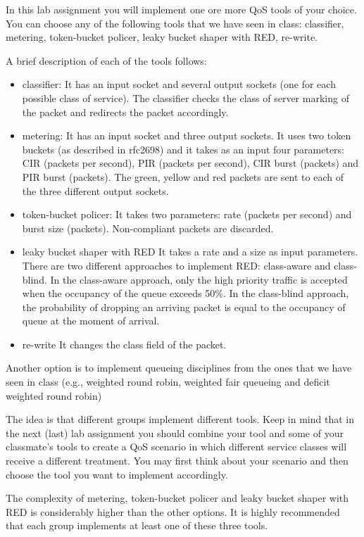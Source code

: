 In this lab assignment you will implement one ore more QoS tools of your choice.
You can choose any of the following tools that we have seen in class: classifier, metering, token-bucket policer, leaky bucket shaper with RED, re-write.

A brief description of each of the tools follows:
\begin{itemize}
  \item{classifier:}
  It has an input socket and several output sockets (one for each possible class of service).
  The classifier checks the class of server marking of the packet and redirects the packet accordingly.
  \item{metering:}
  It has an input socket and three output sockets.
  It uses two token buckets (as described in rfc2698) and it takes as an input four parameters: CIR (packets per second), PIR (packets per second), CIR burst (packets) and PIR burst (packets).
  The green, yellow and red packets are sent to each of the three different output sockets.
  \item{token-bucket policer:}
  It takes two parameters: rate (packets per second) and burst size (packets).
  Non-compliant packets are discarded.
  \item{leaky bucket shaper with RED}
  It takes a rate and a size as input parameters.
  There are two different approaches to implement RED: class-aware and class-blind.
  In the class-aware approach, only the high priority traffic is accepted when the occupancy of the queue exceeds 50\%.
  In the class-blind approach, the probability of dropping an arriving packet is equal to the occupancy of queue at the moment of arrival.
  \item{re-write}
  It changes the class field of the packet.
\end{itemize}

Another option is to implement queueing disciplines from the ones that we have seen in class (e.g., weighted round robin, weighted fair queueing and deficit weighted round robin)

The idea is that different groups implement different tools.
Keep in mind that in the next (last) lab assignment you should combine your tool and some of your classmate's tools to create a QoS scenario in which different service classes will receive a different treatment.
You may first think about your scenario and then choose the tool you want to implement accordingly.

The complexity of metering, token-bucket policer and leaky bucket shaper with RED is considerably higher than the other options.
It is highly recommended that each group implements at least one of these three tools.

